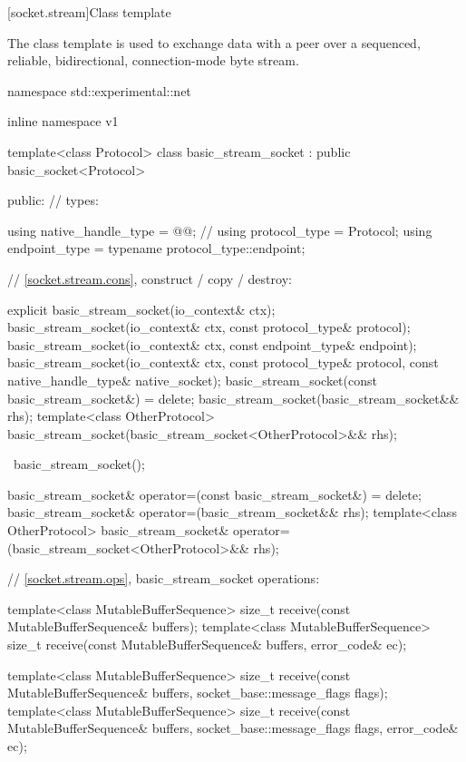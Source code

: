 %
[socket.stream]{Class template }

\pnum
The class template  is used to exchange data with a peer over a sequenced, reliable, bidirectional, connection-mode byte stream.

\begin{codeblock}
namespace std::experimental::net {
inline namespace v1 {

  template<class Protocol>
  class basic_stream_socket : public basic_socket<Protocol>
  {
  public:
    // types:

    using native_handle_type = @@; // \nativeref
    using protocol_type = Protocol;
    using endpoint_type = typename protocol_type::endpoint;

    // \ref{socket.stream.cons}, construct / copy / destroy:

    explicit basic_stream_socket(io_context& ctx);
    basic_stream_socket(io_context& ctx, const protocol_type& protocol);
    basic_stream_socket(io_context& ctx, const endpoint_type& endpoint);
    basic_stream_socket(io_context& ctx, const protocol_type& protocol,
                        const native_handle_type& native_socket);
    basic_stream_socket(const basic_stream_socket&) = delete;
    basic_stream_socket(basic_stream_socket&& rhs);
    template<class OtherProtocol>
      basic_stream_socket(basic_stream_socket<OtherProtocol>&& rhs);

    ~basic_stream_socket();

    basic_stream_socket& operator=(const basic_stream_socket&) = delete;
    basic_stream_socket& operator=(basic_stream_socket&& rhs);
    template<class OtherProtocol>
      basic_stream_socket& operator=(basic_stream_socket<OtherProtocol>&& rhs);

    // \ref{socket.stream.ops}, basic_stream_socket operations:

    template<class MutableBufferSequence>
      size_t receive(const MutableBufferSequence& buffers);
    template<class MutableBufferSequence>
      size_t receive(const MutableBufferSequence& buffers,
                     error_code& ec);

    template<class MutableBufferSequence>
      size_t receive(const MutableBufferSequence& buffers,
                     socket_base::message_flags flags);
    template<class MutableBufferSequence>
      size_t receive(const MutableBufferSequence& buffers,
                     socket_base::message_flags flags, error_code& ec);

}}}
\end{codeblock}
